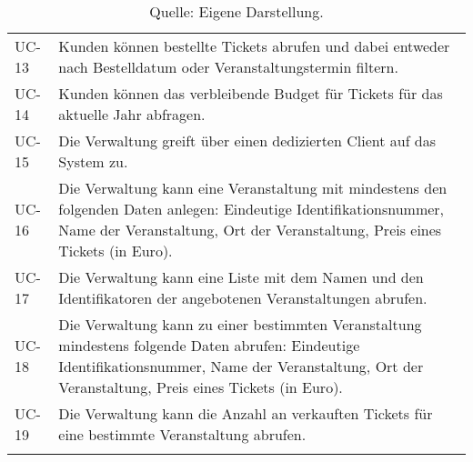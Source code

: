 \begin{longtable}{lp{}}
UC-13 & Kunden können bestellte Tickets abrufen und dabei entweder nach Bestelldatum oder Veranstaltungstermin filtern.\\
UC-14 & Kunden können das verbleibende Budget für Tickets für das aktuelle Jahr abfragen.\\
UC-15 & Die Verwaltung greift über einen dedizierten Client auf das System zu.\\
UC-16 & Die Verwaltung kann eine Veranstaltung mit mindestens den folgenden Daten anlegen: Eindeutige Identifikationsnummer, Name der Veranstaltung, Ort der Veranstaltung, Preis eines Tickets (in Euro).\\
UC-17 & Die Verwaltung kann eine Liste mit dem Namen und den Identifikatoren der angebotenen Veranstaltungen abrufen.\\
UC-18 & Die Verwaltung kann zu einer bestimmten Veranstaltung mindestens folgende Daten abrufen: Eindeutige Identifikationsnummer, Name der Veranstaltung, Ort der Veranstaltung, Preis eines Tickets (in Euro).\\
UC-19 & Die Verwaltung kann die Anzahl an verkauften Tickets für eine bestimmte Veranstaltung abrufen.\\
\bottomrule
\caption*{\footnotesize{Quelle: Eigene Darstellung.}}
\end{longtable}
\endgroup
